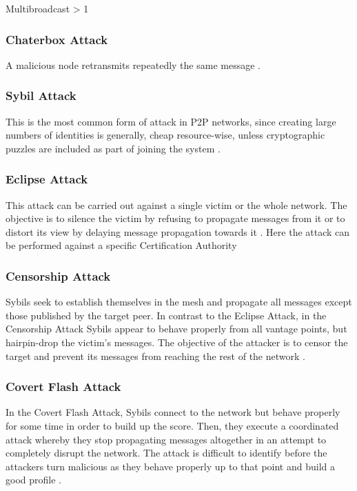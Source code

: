 \documentclass{article}
\begin{document}
Multibroadcast > 1


\subsubsection{Chaterbox Attack}
A malicious node retransmits repeatedly the same message \cite{AdHocNet}.

\subsubsection{Sybil Attack}
This is the most common form of attack in P2P networks, since creating large numbers of identities is
generally, cheap resource-wise, unless cryptographic puzzles are included as part of joining the system \cite{GossipSub}.

\subsubsection{Eclipse Attack}
This attack can be carried out against a single victim or the whole network. The objective is to
silence the victim by refusing to propagate messages from it or to distort its view by delaying message propagation towards it \cite{GossipSub}.
Here the attack can be performed against a specific Certification Authority

\subsubsection{Censorship Attack}
Sybils seek to establish themselves in the mesh and propagate all messages except those published by the target peer. In contrast to the Eclipse Attack, in the Censorship Attack Sybils appear to behave properly
from all vantage points, but hairpin-drop the victim's messages. The objective of the attacker is to censor the target and prevent its messages from reaching the rest of the network \cite{GossipSub}.

\subsubsection{Covert Flash Attack}
In the Covert Flash Attack, Sybils connect to the network but behave properly for some time in order to build up the score. Then, they execute a coordinated attack whereby they stop propagating messages altogether in an attempt to completely disrupt the network. The attack is difficult to identify before the attackers turn malicious as they behave properly up to that point and build a good profile \cite{GossipSub}.
\end{document}
